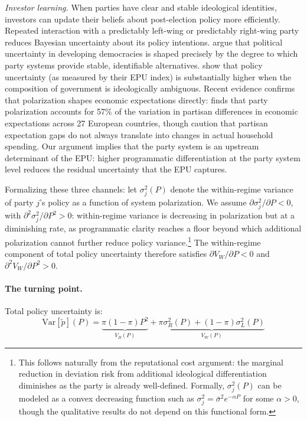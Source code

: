 \documentclass[12pt]{article}
\begin{document}
\textit{Investor learning.} When parties have clear and stable ideological
identities, investors can update their beliefs about post-election policy
more efficiently. Repeated interaction with a predictably left-wing or
predictably right-wing party reduces Bayesian uncertainty about its
policy intentions. \citet{LupuRiedl2013} argue that political uncertainty
in developing democracies is shaped precisely by the degree to which
party systems provide stable, identifiable alternatives.
\citet{Baker2016} show that policy uncertainty (as
measured by their EPU index) is substantially higher when the
composition of government is ideologically ambiguous. Recent evidence
confirms that polarization shapes economic expectations directly:
\citet{Guirola2025} finds that party polarization accounts for 57\% of
the variation in partisan differences in economic expectations across 27
European countries, though \citet{MianSufiKhoshkhou2023} caution that
partisan expectation gaps do not always translate into changes in actual
household spending. Our argument implies that the party system is an
upstream determinant of the EPU: higher programmatic differentiation at
the party system level reduces the residual uncertainty that the EPU
captures.

Formalizing these three channels: let $\sigma_j^2(P)$ denote
the within-regime variance of party $j$'s policy as a function of system
polarization. We assume $\partial \sigma_j^2 / \partial P < 0$, with
$\partial^2 \sigma_j^2 / \partial P^2 > 0$: within-regime variance is
decreasing in polarization but at a diminishing rate, as programmatic
clarity reaches a floor beyond which additional polarization cannot further
reduce policy variance.\footnote{This follows naturally from the reputational
cost argument: the marginal reduction in deviation risk from additional
ideological differentiation diminishes as the party is already well-defined.
Formally, $\sigma_j^2(P)$ can be modeled as a convex decreasing function such
as $\sigma_j^2 = \bar{\sigma}^2 e^{-\alpha P}$ for some $\alpha > 0$, though
the qualitative results do not depend on this functional form.} The
within-regime component of total policy uncertainty therefore satisfies
$\partial V_W / \partial P < 0$ and $\partial^2 V_W / \partial P^2 > 0$.

\paragraph{The turning point.} Total policy uncertainty is:
\begin{equation}
\label{eq:total}
\text{Var}[\tilde{p}](P) = \underbrace{\pi(1-\pi)P^2}_{V_B(P)} +
\underbrace{\pi\sigma_R^2(P) + (1-\pi)\sigma_L^2(P)}_{V_W(P)}
\end{equation}
\end{document}
